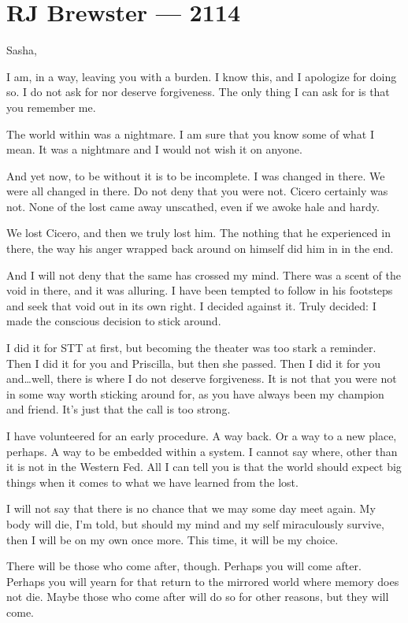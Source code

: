 \hypertarget{rj-brewster-2114}{%
\chapter*{RJ Brewster — 2114}\label{rj-brewster-2114}}

Sasha,

I am, in a way, leaving you with a burden. I know this, and I apologize for doing so. I do not ask for nor deserve forgiveness. The only thing I can ask for is that you remember me.

The world within was a nightmare. I am sure that you know some of what I mean. It was a nightmare and I would not wish it on anyone.

And yet now, to be without it is to be incomplete. I was changed in there. We were all changed in there. Do not deny that you were not. Cicero certainly was not. None of the lost came away unscathed, even if we awoke hale and hardy.

We lost Cicero, and then we truly lost him. The nothing that he experienced in there, the way his anger wrapped back around on himself did him in in the end.

And I will not deny that the same has crossed my mind. There was a scent of the void in there, and it was alluring. I have been tempted to follow in his footsteps and seek that void out in its own right. I decided against it. Truly decided: I made the conscious decision to stick around.

I did it for STT at first, but becoming the theater was too stark a reminder. Then I did it for you and Priscilla, but then she passed. Then I did it for you and\ldots{}well, there is where I do not deserve forgiveness. It is not that you were not in some way worth sticking around for, as you have always been my champion and friend. It's just that the call is too strong.

I have volunteered for an early procedure. A way back. Or a way to a new place, perhaps. A way to be embedded within a system. I cannot say where, other than it is not in the Western Fed. All I can tell you is that the world should expect big things when it comes to what we have learned from the lost.

I will not say that there is no chance that we may some day meet again. My body will die, I'm told, but should my mind and my self miraculously survive, then I will be on my own once more. This time, it will be my choice.

There will be those who come after, though. Perhaps you will come after. Perhaps you will yearn for that return to the mirrored world where memory does not die. Maybe those who come after will do so for other reasons, but they will come.

